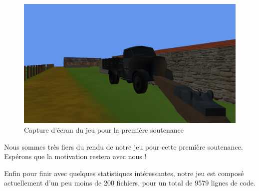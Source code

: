 \documentclass[11pt]{report}
\begin{document}
\begin{figure}[htbp]
\centering
\includegraphics[scale=0.18]{resultat-1.png}
\caption{Capture d'écran du jeu pour la première soutenance}
\end{figure}

Nous sommes très fiers du rendu de notre jeu pour cette première soutenance. Espérons que la motivation restera avec nous !

Enfin pour finir avec quelques statistiques intéressantes, notre jeu est composé actuellement d'un peu moins de 200 fichiers, pour un total de 9579 lignes de code.

\newpage
\listoffigures 
 
\end{document}
